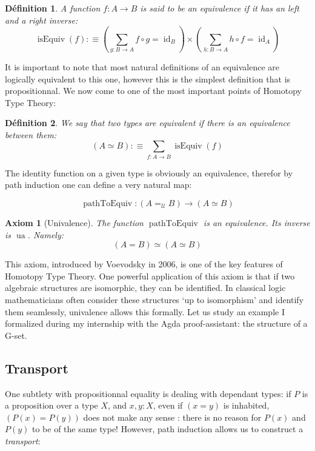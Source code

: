 \documentclass{article}
\DeclareMathOperator{\ua}{ua}
\DeclareMathOperator{\id}{id}
\DeclareMathOperator{\isequiv}{isEquiv}
\DeclareMathOperator{\pathtoequiv}{pathToEquiv}
\newtheorem{definition}{Définition}[section]
\newtheorem{axiom}{Axiom}[section]
\begin{document}
\begin{definition}
  A function $f : A \to B$ is said to be an \emph{equivalence} if it has an left and a right inverse:
  \[\isequiv(f) :\equiv \left(  \sum_{g : B \to A} f \circ g = \id_{B} \right) \times \left(  \sum_{h : B \to A}h \circ f = \id_{A} \right) \]
\end{definition}

It is important to note that most natural definitions of an equivalence are logically equivalent to this one, however this is the simplest definition that is propositionnal. We now come to one of the most important points of Homotopy Type Theory:

\begin{definition}
  We say that two types are \emph{equivalent} if there is an equivalence between them:
  \[(A \simeq B) :\equiv \sum_{f : A \to B} \isequiv(f) \]
\end{definition}

The identity function on a given type is obviously an equivalence, therefor by path induction one can define a very natural map:

\[\pathtoequiv : (A =_{\mathcal{U}} B) \to (A \simeq B)\]

\begin{axiom}[Univalence]
  The function $\pathtoequiv$ is an equivalence. Its inverse is $\ua$. Namely:
  \[(A = B) \simeq (A \simeq B)\]
\end{axiom}

This axiom, introduced by Voevodsky in 2006, is one of the key features of Homotopy Type Theory. One powerful application of this axiom is that if two algebraic structures are isomorphic, they can be identified. In classical logic mathematicians often consider these structures `up to isomorphism' and identify them seamlessly, univalence allows this formally. Let us study an example I formalized during my internship with the Agda proof-assistant: the structure of a G-set.

\subsection{Transport}\label{transport}

One subtlety with propositionnal equality is dealing with dependant types: if $P$ is a proposition over a type $X$, and $x,y : X$, even if $(x = y)$ is inhabited, $(P(x) = P(y))$ does not make any sense : there is no reason for $P(x)$ and $P(y)$ to be of the same type! However, path induction allows us to construct a \emph{transport}:
\end{document}
